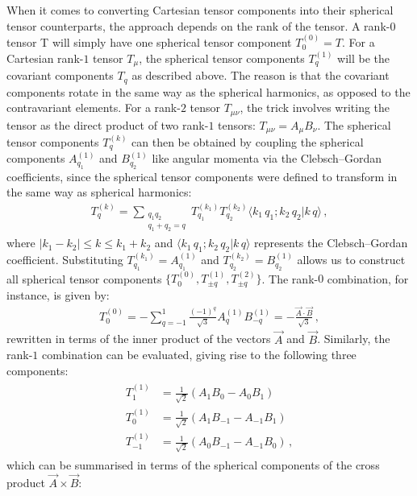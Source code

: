 \documentclass[../Thesis-IJspeert.tex]{subfiles}
\begin{document}
\begin{appendices}
When it comes to converting Cartesian tensor components into their spherical tensor counterparts, the approach depends on the rank of the tensor. A rank-$0$ tensor T will simply have one spherical tensor component $T_0^{(0)}=T$. For a Cartesian rank-$1$ tensor $T_\mu$, the spherical tensor components $T^{(1)}_q$ will be the covariant components $T_q$ as described above. The reason is that the covariant components rotate in the same way as the spherical harmonics, as opposed to the contravariant elements. For a rank-$2$ tensor $T_{\mu\nu}$, the trick involves writing the tensor as the direct product of two rank-$1$ tensors: $T_{\mu\nu}=A_\mu B_\nu$. The spherical tensor components $T_q^{(k)}$ can then be obtained by coupling the spherical components $A^{(1)}_{q_1}$ and $B^{(1)}_{q_2}$ like angular momenta via the Clebsch–Gordan coefficients, since the spherical tensor components were defined to transform in the same way as spherical harmonics:
\begin{align}
	T_q^{(k)}=\sum_{\substack{q_1q_2\\
			q_1+q_2=q}} T^{(k_1)}_{q_1} T^{(k_2)}_{q_2} \langle k_1\, q_1 ; k_2\, q_2 \vert k\, q \rangle\,,
\end{align}
where $\vert k_1 - k_2 \vert \le k \le k_1 + k_2$ and $\langle k_1\, q_1 ; k_2\, q_2 \vert k\, q \rangle$ represents the Clebsch–Gordan coefficient. Substituting $T^{(k_1)}_{q_1}=A^{(1)}_{q_1}$ and $T^{(k_2)}_{q_2}=B^{(1)}_{q_2}$ allows us to construct all spherical tensor components $\{T_0^{(0)}, T_{\pm q}^{(1)}, T_{\pm q}^{(2)}\}$. The rank-$0$ combination, for instance, is given by:
\begin{align}
	T_0^{(0)}=-\sum_{q=-1}^{1} \frac{(-1)^q}{\sqrt{3}}A^{(1)}_q B^{(1)}_{-q}=-\frac{\vec{A}\cdot\vec{B}}{\sqrt{3}}\,,
\end{align}
rewritten in terms of the inner product of the vectors $\vec{A}$ and $\vec{B}$. Similarly, the rank-$1$ combination can be evaluated, giving rise to the following three components:
\begin{align}
\begin{split}
T_1^{(1)} &= \frac{1}{\sqrt{2}}(A_1B_0-A_0B_1)\\
T_0^{(1)} &= \frac{1}{\sqrt{2}}(A_1B_{-1}-A_{-1}B_1)\\
T_{-1}^{(1)} &= \frac{1}{\sqrt{2}}(A_0B_{-1}-A_{-1}B_0)\,,
\end{split}
\end{align}
which can be summarised in terms of the spherical components of the cross product $\vec{A}\times\vec{B}$:
\begin{align}

\end{align}
\end{appendices}
\end{document}
